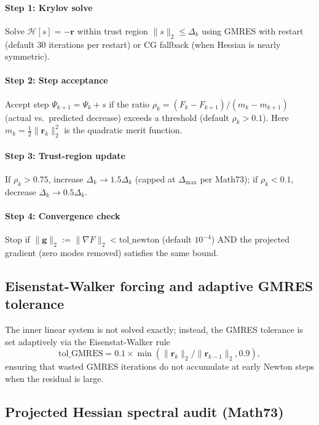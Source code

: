 \paragraph{Step 1: Krylov solve}
Solve $\mathcal{H}[s] = -\mathbf{r}$ within trust region $\|s\|_2 \leq \Delta_k$
using GMRES with restart (default 30 iterations per restart) or CG
fallback (when Hessian is nearly symmetric).

\paragraph{Step 2: Step acceptance}
Accept step $\Psi_{k+1} = \Psi_k + s$ if the ratio $\rho_k = (F_k - F_{k+1})
/ (m_k - m_{k+1})$ (actual vs.\ predicted decrease) exceeds a threshold
(default $\rho_k > 0.1$). Here $m_k = \frac{1}{2}\|\mathbf{r}_k\|_2^2$ is
the quadratic merit function.

\paragraph{Step 3: Trust-region update}
If $\rho_k > 0.75$, increase $\Delta_k \to 1.5\Delta_k$ (capped at
$\Delta_{\max}$ per Math73); if $\rho_k < 0.1$, decrease
$\Delta_k \to 0.5\Delta_k$.

\paragraph{Step 4: Convergence check}
Stop if $\|\mathbf{g}\|_2 := \|\nabla F\|_2 < \text{tol\_newton}$ (default
$10^{-4}$) AND the projected gradient (zero modes removed) satisfies the
same bound.

\subsection{Eisenstat-Walker forcing and adaptive GMRES tolerance}

The inner linear system is not solved exactly; instead, the GMRES
tolerance is set adaptively via the Eisenstat-Walker rule
\begin{equation}
\text{tol\_GMRES} = 0.1 \times \min(\|\mathbf{r}_k\|_2 / \|\mathbf{r}_{k-1}\|_2, 0.9),
\end{equation}
ensuring that wasted GMRES iterations do not accumulate at early Newton
steps when the residual is large.

\subsection{Projected Hessian spectral audit (Math73)}

